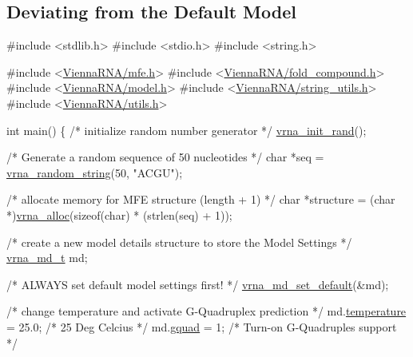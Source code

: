 \subsection*{Deviating from the Default Model }


\begin{DoxyCodeInclude}
\textcolor{preprocessor}{#include <stdlib.h>}
\textcolor{preprocessor}{#include <stdio.h>}
\textcolor{preprocessor}{#include <string.h>}

\textcolor{preprocessor}{#include <\hyperlink{mfe_8h}{ViennaRNA/mfe.h}>}
\textcolor{preprocessor}{#include <\hyperlink{fold__compound_8h}{ViennaRNA/fold\_compound.h}>}
\textcolor{preprocessor}{#include <\hyperlink{model_8h}{ViennaRNA/model.h}>}
\textcolor{preprocessor}{#include <\hyperlink{string__utils_8h}{ViennaRNA/string\_utils.h}>}
\textcolor{preprocessor}{#include <\hyperlink{utils_8h}{ViennaRNA/utils.h}>}

\textcolor{keywordtype}{int}
main()
\{
  \textcolor{comment}{/* initialize random number generator */}
  \hyperlink{group__utils_ga0ad1f40ea316e5c5918695c35613027a}{vrna\_init\_rand}();

  \textcolor{comment}{/* Generate a random sequence of 50 nucleotides */}
  \textcolor{keywordtype}{char}      *seq = \hyperlink{group__string__utils_ga4eeb3750dcf860b9f3158249f95dbd7f}{vrna\_random\_string}(50, \textcolor{stringliteral}{"ACGU"});

  \textcolor{comment}{/* allocate memory for MFE structure (length + 1) */}
  \textcolor{keywordtype}{char}      *structure = (\textcolor{keywordtype}{char} *)\hyperlink{group__utils_gaf37a0979367c977edfb9da6614eebe99}{vrna\_alloc}(\textcolor{keyword}{sizeof}(\textcolor{keywordtype}{char}) * (strlen(seq) + 1));

  \textcolor{comment}{/* create a new model details structure to store the Model Settings */}
  \hyperlink{group__model__details_structvrna__md__s}{vrna\_md\_t} md;

  \textcolor{comment}{/* ALWAYS set default model settings first! */}
  \hyperlink{group__model__details_ga8ac6ff84936282436f822644bf841f66}{vrna\_md\_set\_default}(&md);

  \textcolor{comment}{/* change temperature and activate G-Quadruplex prediction */}
  md.\hyperlink{group__model__details_a5f7e5c2b65bada5188443470e576aa4b}{temperature}  = 25.0; \textcolor{comment}{/* 25 Deg Celcius */}
  md.\hyperlink{group__model__details_af88a511a2b1f526b4c6213de6cb8fd6e}{gquad}        = 1;    \textcolor{comment}{/* Turn-on G-Quadruples support */}


\end{DoxyCodeInclude}
